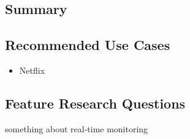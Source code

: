 \subsection{Summary}

\subsection{Recommended Use Cases}
\begin{itemize}
  \item Netflix
\end{itemize}


\subsection{Feature Research Questions}
something about real-time monitoring